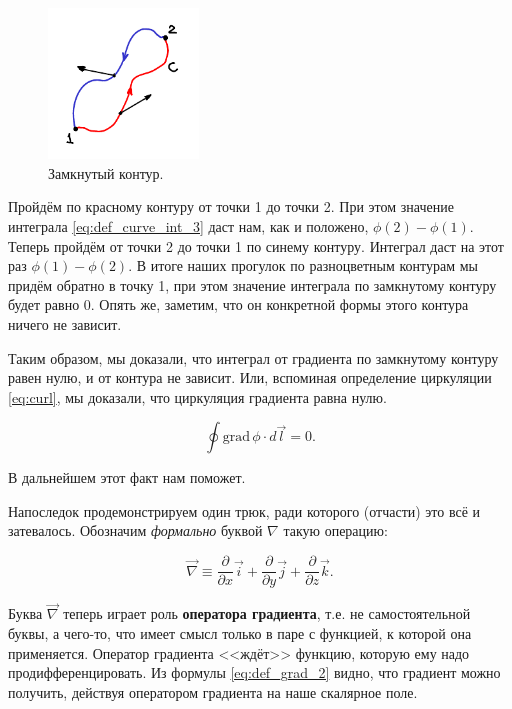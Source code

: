 \documentclass[11pt,a4paper]{article}
\numberwithin{equation}{section}
\newcommand{\pt}{\partial}
\newcommand{\grad}{\mathrm{grad}\,}
\begin{document}
\begin{figure}
  \vspace{-1.5cm}
  \begin{center}
    \includegraphics[width=4cm,height=4cm]{path_indep.pdf}
  \end{center}
  \vspace{-0.7cm}
  \caption{Замкнутый контур.}
  \label{fig:path_indep}
\end{figure}

Пройдём по красному контуру от точки 1 до точки 2. При этом значение
интеграла \eqref{eq:def_curve_int_3} даст нам, как и положено, $\phi(2)
- \phi(1)$. Теперь пройдём от точки 2 до точки 1 по синему
контуру. Интеграл даст на этот раз $\phi(1) - \phi(2)$. В итоге наших
прогулок по разноцветным контурам мы придём обратно в точку 1, при
этом значение интеграла по замкнутому контуру будет равно 0. Опять же,
заметим, что он конкретной формы этого контура ничего не зависит. 

Таким образом, мы доказали, что интеграл от градиента по замкнутому
контуру равен нулю, и от контура не зависит. Или, вспоминая
определение циркуляции \eqref{eq:curl}, мы доказали, что циркуляция
градиента равна нулю.

\begin{equation}
  \label{eq:int_grad}
  \oint \grad \phi \cdot  d\vec{l} =0.
\end{equation}

В дальнейшем этот факт нам поможет. 

Напоследок продемонстрируем один трюк, ради которого (отчасти) это всё
и затевалось. Обозначим \emph{формально} буквой $\nabla$ такую
операцию:

\begin{equation}
  \label{eq:def_nabla}
  \vec{\nabla} \equiv \frac{\pt}{\pt x} \vec{i} +  \frac{\pt}{\pt y}
  \vec{j} +  \frac{\pt}{\pt z} \vec{k}.
\end{equation}

Буква $\vec{\nabla}$ теперь играет роль \textbf{оператора градиента},
т.е. не самостоятельной буквы, а чего-то, что имеет смысл только в
паре с функцией, к которой она применяется. Оператор градиента
<<ждёт>> функцию, которую ему надо продифференцировать. Из формулы
\eqref{eq:def_grad_2} видно, что градиент можно получить, действуя
оператором градиента на наше скалярное поле.
\end{document}
